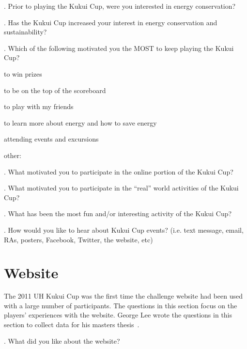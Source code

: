 \vspace{5 mm}
. Prior to playing the Kukui Cup, were you interested in energy conservation?

\vspace{5 mm}
. Has the Kukui Cup increased your interest in energy conservation and sustainability?

\vspace{5 mm}
. Which of the following motivated you the MOST to keep playing the Kukui Cup?

\begin{radiobutton}
	\item to win prizes
	\item to be on the top of the scoreboard
	\item to play with my friends
	\item to learn more about energy and how to save energy
	\item attending events and excursions
	\item other: \underline{\hspace{4cm}}
\end{radiobutton}

\vspace{5 mm}
. What motivated you to participate in the online portion of the Kukui Cup?

\vspace{5 mm}
. What motivated you to participate in the ``real'' world activities of the Kukui Cup?

\vspace{5 mm}
. What has been the most fun and/or interesting activity of the Kukui Cup?

\vspace{5 mm}
. How would you like to hear about Kukui Cup events? (i.e. text message, email, RAs, posters, Facebook, Twitter, the website, etc)


\section{Website}

The 2011 UH Kukui Cup was the first time the challenge website had been used with a large number of participants. The questions in this section focus on the players' experiences with the website. George Lee wrote the questions in this section to collect data for his masters thesis~\cite{csdl2-11-01}.

\vspace{5 mm}
. What did you like about the website?

